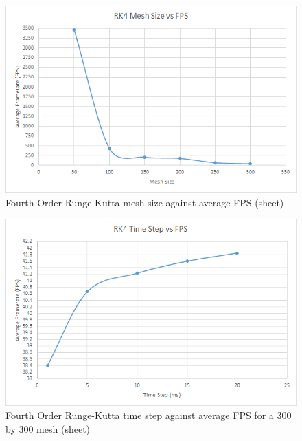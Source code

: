    \begin{figure}
    \begin{center}
      \includegraphics[scale=.9]{Figures/sheet_rk4_m_fps}
    \end{center}
    \caption{Fourth Order Runge-Kutta mesh size against average FPS (sheet)}
    \label{fig:rk4 mesh fps sheet}
  \end{figure}
  
    \begin{figure}
    \begin{center}
      \includegraphics[scale=.9]{Figures/sheet_rk4_ts_fps}
    \end{center}
    \caption{Fourth Order Runge-Kutta time step against average FPS for a 300 by 300 mesh (sheet)}
    \label{fig:rk4 step fps sheet}
  \end{figure}
  
